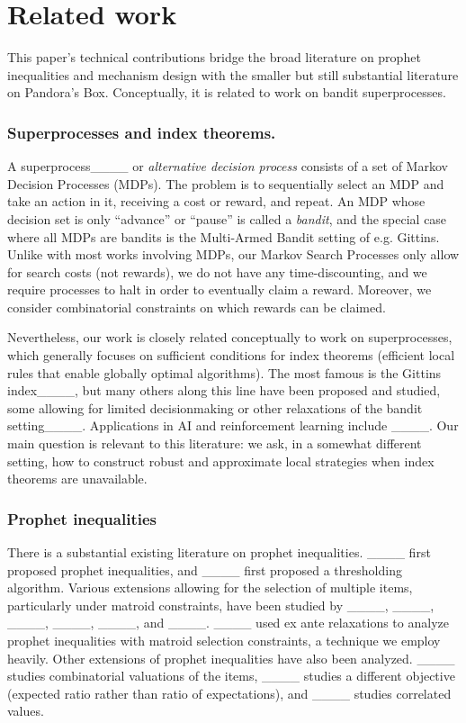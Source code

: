 \section{Related work}
\label{subsec:related}

This paper's technical contributions bridge the broad literature on prophet inequalities and mechanism design with the smaller but still substantial literature on Pandora's Box.
Conceptually, it is related to work on bandit superprocesses.

\subsubsection{Superprocesses and index theorems.}
A superprocess____ or \emph{alternative decision process} consists of a set of Markov Decision Processes (MDPs).
The problem is to sequentially select an MDP and take an action in it, receiving a cost or reward, and repeat.
An MDP whose decision set is only ``advance'' or ``pause'' is called a \emph{bandit}, and the special case where all MDPs are bandits is the Multi-Armed Bandit setting of e.g. Gittins.
Unlike with most works involving MDPs, our Markov Search Processes only allow for search costs (not rewards), we do not have any time-discounting, and we require processes to halt in order to eventually claim a reward.
Moreover, we consider combinatorial constraints on which rewards can be claimed.

Nevertheless, our work is closely related conceptually to work on superprocesses, which generally focuses on sufficient conditions for index theorems (efficient local rules that enable globally optimal algorithms).
The most famous is the Gittins index____, but many others along this line have been proposed and studied, some allowing for limited decisionmaking or other relaxations of the bandit setting____.
Applications in AI and reinforcement learning include ____.
Our main question is relevant to this literature: we ask, in a somewhat different setting, how to construct robust and approximate local strategies when index theorems are unavailable.

\subsubsection{Prophet inequalities}
There is a substantial existing literature on prophet inequalities.
____ first proposed prophet inequalities, and ____ first proposed a thresholding algorithm.
Various extensions allowing for the selection of multiple items, particularly under matroid constraints, have been studied by  ____, ____, ____, ____, ____, and ____.
____ used ex ante relaxations to analyze prophet inequalities with matroid selection constraints, a technique we employ heavily.
Other extensions of prophet inequalities have also been analyzed.
____ studies combinatorial valuations of the items, ____ studies a different objective (expected ratio rather than ratio of expectations), and ____ studies correlated values.

